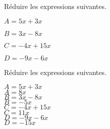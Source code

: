 \begin{exercice*}
    Réduire les expressions suivantes.
    \begin{multicols}{2}
        \begin{itemize}
            \begin{spacing}{1.2}
                \item[] $A=5x+3x$
                \item[] $B=3x-8x$
                \item[] $C=-4x+15x$
                \item[] $D=-9x-6x$
            \end{spacing}
        \end{itemize}
    \end{multicols}    
\end{exercice*}
\begin{corrige}
    Réduire les expressions suivantes.
    \begin{multicols}{2}
        \begin{itemize}
            \def\item{}
            \item $A=5x+3x$\\
            {\red $A=8x$}\\\smallskip
            \item $B=3x-8x$\\
            {\red $B=-5x$}\\\smallskip
            \item $C=-4x+15x$\\
            {\red $C=11x$}\\\smallskip
            \item $D=-9x-6x$\\
            {\red $D=-15x$}            
        \end{itemize}
    \end{multicols}
\end{corrige}

